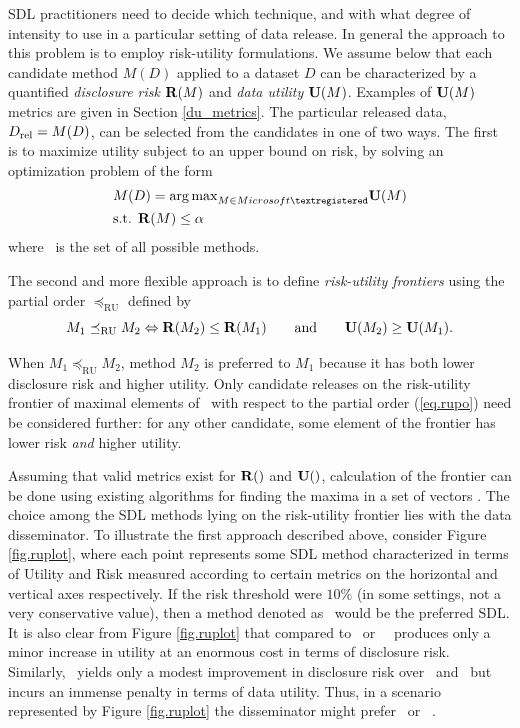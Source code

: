 
SDL practitioners need to decide which technique, and with what
degree of intensity to use in a particular setting of data release. 
In general the approach to this problem is to employ risk-utility formulations. We assume
below that each candidate method $M(D)$ applied to a dataset $D$ can be characterized by a quantified
\textit{disclosure risk} $\mathbf{R} (M)$ and \textit{data utility} $\mathbf{U}
(M)$.  Examples of $\mathbf{U}(M)$ metrics are given in Section \ref{du_metrics}.
The particular released data, $D_{\mathrm{rel}} = M(D)$, can be selected from
the candidates in one of two ways. The first is to maximize
utility subject to an upper bound on risk, by solving an
optimization problem of the form
\begin{equation}\label{eq.opt}
\begin{array}{l}
M(D) = {\arg\max}_{M \in \MS} \DU (M) \\[1ex]
\mbox{s.t. } \DR(M) \leq \alpha
\end{array}
\end{equation}
where \MS\ is the set of all possible methods. 

The second and more flexible approach is to define \textit{risk-utility
frontiers} using the partial order $\preceq_{\mathrm{RU}}$ defined
by
\begin{equation}\label{eq.rupo}
M_1 \preceq_{\mathrm{RU}} M_2 \Leftrightarrow \mathbf{R}(M_2) \leq
\mathbf{R}(M_1) \qquad\mbox{and}\qquad \mathbf{U}(M_2) \geq \mathbf{U}(M_1).
\end{equation}

When $M_1 \preceq_{\mathrm{RU}} M_2$, method $M_2$ is preferred to
$M_1$ because it has both lower disclosure risk and higher
utility. Only candidate releases on the risk-utility frontier of
maximal elements of \RS\ with respect to the partial order
(\ref{eq.rupo}) need be considered further: for any other
candidate, some element of the frontier has lower risk
\textit{and} higher utility. 

Assuming that valid metrics exist for $\mathbf{R}()$ and $\mathbf{U}()$, calculation of the frontier can be
done using existing algorithms for finding the maxima in a set of
vectors \citep{kung-luccio-preparata75}. 
The choice among the SDL methods lying on the risk-utility
frontier lies with the data disseminator. To illustrate the first approach
described above, consider Figure \ref{fig.ruplot}, where each point
represents some SDL method characterized in terms of Utility and Risk 
measured according to certain metrics on the horizontal and vertical axes respectively.
If the risk threshold were $10\%$ (in some settings, not a very conservative value), 
then a method denoted as \NOI\ would be the preferred SDL. It is also clear from Figure \ref{fig.ruplot} that compared to \MICZ\ or \NOI\, \MICI\ produces only a minor increase
in utility at an enormous cost in terms of disclosure risk. Similarly,
\RANK\ yields only a modest improvement in disclosure
risk over \MICP\ and \NOI\, but incurs an immense
penalty in terms of data utility. Thus, in a scenario represented by Figure \ref{fig.ruplot}
 the disseminator  might prefer \NOI\ or \MICP\ .

